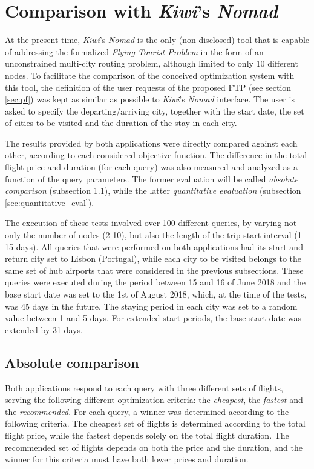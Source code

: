 \section{Comparison with \textit{Kiwi}'s \textit{Nomad}}
\label{sec:nomad}

At the present time, \textit{Kiwi}'s \textit{Nomad} is the only (non-disclosed) tool that is capable of addressing the formalized \textit{Flying Tourist Problem} in the form of an unconstrained multi-city routing problem, although limited to only 10 different nodes. To facilitate the comparison of the conceived optimization system with this tool, the definition of the user requests of the proposed FTP (see section \ref{sec:pf}) was kept as similar as possible to \textit{Kiwi}'s \textit{Nomad} interface. The user is asked to specify the departing/arriving city, together with the start date, the set of cities to be visited and the duration of the stay in each city.

The results provided by both applications were directly compared against each other, according to each considered objective function. The difference in the total flight price and duration (for each query) was also measured and analyzed as a function of the query parameters. The former evaluation will be called \textit{absolute comparison} (subsection \ref{sec:absolute_eval}), while the latter \textit{quantitative evaluation} (subsection \ref{sec:quantitative_eval}).

The execution of these tests involved over 100 different queries, by varying not only the number of nodes (2-10), but also the length of the trip start interval (1-15 days). All queries that were performed on both applications had its start and return city set to Lisbon (Portugal), while each city to be visited belongs to the same set of hub airports that were considered in the previous subsections.  These queries were executed during the period between 15 and 16 of June 2018 and the base start date was set to the 1st of August 2018, which, at the time of the tests, was 45 days in the future. The staying period in each city was set to a random value between 1 and 5 days. For extended start periods, the base start date was extended by 31 days.


\subsection{Absolute comparison}
\label{sec:absolute_eval}

Both applications respond to each query with three different sets of flights, serving the following different optimization criteria: the \textit{cheapest}, the \textit{fastest} and the \textit{recommended}. For each query, a winner was determined according to the following criteria. The cheapest set of flights is determined according to the total flight price, while the fastest depends solely on the total flight duration. The recommended set of flights depends on both the price and the duration, and the winner for this criteria must have both lower prices and duration. 

